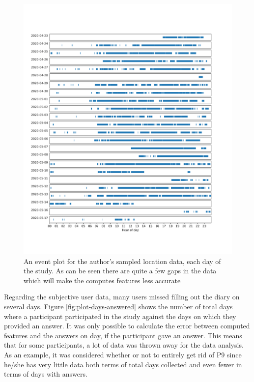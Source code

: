 \begin{figure}[h]
    \centering
    \includegraphics[width=\textwidth]{images/study/thomas-gaps.png}
    \caption{An event plot for the author's sampled location data, each day of the study. As can be seen there are quite a few gaps in the data which will make the computes features less accurate}
    \label{fig:plot-gaps-data}
\end{figure}

Regarding the subjective user data, many users missed filling out the diary on several days. Figure \ref{fig:plot-days-answered} shows the number of total days where a participant participated in the study against the days on which they provided an answer. It was only possible to calculate the error between computed features and the answers on day, if the participant gave an answer. This means that for some participants, a lot of data was thrown away for the data analysis. As an example, it was considered whether or not to entirely get rid of P9 since he/she has very little data both terms of total days collected and even fewer in terms of days with answers. 

